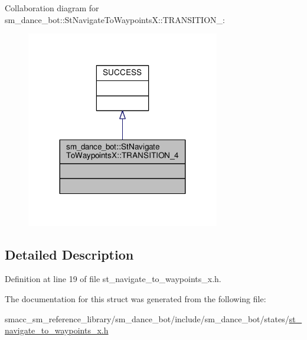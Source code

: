 Collaboration diagram for sm\+\_\+dance\+\_\+bot\+:\+:St\+Navigate\+To\+WaypointsX\+:\+:T\+R\+A\+N\+S\+I\+T\+I\+O\+N\+\_\+:\nopagebreak
\begin{figure}[H]
\begin{center}
\leavevmode
\includegraphics[width=239pt]{structsm__dance__bot_1_1StNavigateToWaypointsX_1_1TRANSITION__4__coll__graph}
\end{center}
\end{figure}


\subsection{Detailed Description}


Definition at line 19 of file st\+\_\+navigate\+\_\+to\+\_\+waypoints\+\_\+x.\+h.



The documentation for this struct was generated from the following file\+:\begin{DoxyCompactItemize}
\item 
smacc\+\_\+sm\+\_\+reference\+\_\+library/sm\+\_\+dance\+\_\+bot/include/sm\+\_\+dance\+\_\+bot/states/\hyperlink{include_2sm__dance__bot_2states_2st__navigate__to__waypoints__x_8h}{st\+\_\+navigate\+\_\+to\+\_\+waypoints\+\_\+x.\+h}\end{DoxyCompactItemize}
